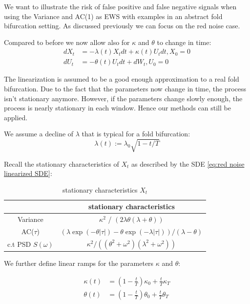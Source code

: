 \documentclass[%
thesis=student,%
coverpage=false,%
titlepage=false,%
headmarks=true, %
english,%
font=libertine, %
math=newpxtx, %
BCOR=5mm,%
coverBCOR=11mm%
]{tumbook}
\begin{document}
We want to illustrate the risk of false positive and false negative signals when using the Variance and AC(1) as EWS with examples in an abstract fold bifurcation setting. As discussed previously we can focus on the red noise case.

Compared to before we now allow also for $\kappa$ and $\theta$ to change in time:
    \begin{subequations}
    \begin{align*}
        dX_{t} &= -\lambda(t) X_{t}dt + \kappa(t) U_{t}dt, X_{0} = 0 \\
        dU_{t} &= -\theta(t) U_{t}dt + dW_{t}, U_{0} = 0
    \end{align*}
    \end{subequations}

The linearization is assumed to be a good enough approximation to a real fold bifurcation. Due to the fact that the parameters now change in time, the process isn't stationary anymore. However, if the parameters change slowly enough, the process is nearly stationary in each window. Hence our methods can still be applied.

We assume a decline of $\lambda$ that is typical for a fold bifurcation: 
    \[
    \lambda(t) := \lambda_{0}\sqrt{1-t/T}
    \]

Recall the stationary characteristics of $X_{t}$ as described by the SDE \ref{eq:red noise linearized SDE}: 

\begin{table}[h!]
\centering
\begin{tabular}{|c|c|}
\hline
& stationary characteristics\\
\hline
Variance & $\kappa^2$ / $(2\lambda\theta(\lambda + \theta))$\\
AC($\tau$) & $(\lambda\exp(-\theta\lvert\tau\rvert)-\theta\exp(-\lambda\lvert\tau\rvert))/(\lambda - \theta)$\\
c.t PSD $S(\omega)$ & $\kappa^2/((\theta^2 + \omega^2)(\lambda^2 + \omega^2))$\\
\hline
\end{tabular}
\caption{stationary characteristics $X_{t}$}
\label{tab:simple_table}
\end{table}

We further define linear ramps for the parameters $\kappa$ and $\theta$:

\begin{subequations}
    \begin{align*}
        \kappa(t) &= (1-\frac{t}{T})\kappa_{0} + \frac{t}{T}\kappa_{T} \\
        \theta(t) &= (1-\frac{t}{T})\theta_{0} + \frac{t}{T}\theta_{T}
    \end{align*}
\end{subequations}
\end{document}
